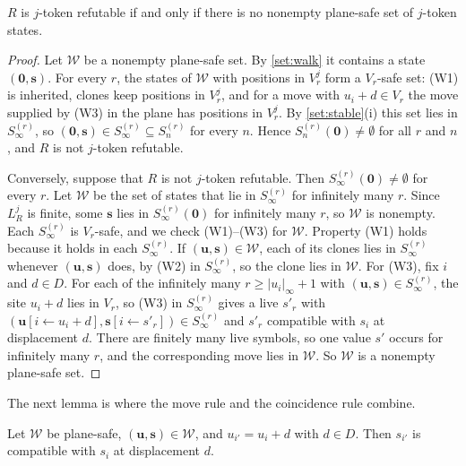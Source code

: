 \begin{lemma}\label{set:plane}
$R$ is $j$-token refutable if and only if there is no nonempty plane-safe set of $j$-token states.
\end{lemma}

\begin{proof}
Let $\mathcal W$ be a nonempty plane-safe set. By \cref{set:walk} it contains a state $(\mathbf 0,\mathbf s)$. For every $r$, the states of $\mathcal W$ with positions in $V_r^j$ form a $V_r$-safe set: (W1) is inherited, clones keep positions in $V_r^j$, and for a move with $u_i+d\in V_r$ the move supplied by (W3) in the plane has positions in $V_r^j$. By \cref{set:stable}(i) this set lies in $S^{(r)}_\infty$, so $(\mathbf 0,\mathbf s)\in S^{(r)}_\infty\subseteq S^{(r)}_n$ for every $n$. Hence $S^{(r)}_n(\mathbf 0)\ne\emptyset$ for all $r$ and $n$, and $R$ is not $j$-token refutable.

Conversely, suppose that $R$ is not $j$-token refutable. Then $S^{(r)}_\infty(\mathbf 0)\ne\emptyset$ for every $r$. Let $\mathcal W$ be the set of states that lie in $S^{(r)}_\infty$ for infinitely many $r$. Since $L_R^j$ is finite, some $\mathbf s$ lies in $S^{(r)}_\infty(\mathbf 0)$ for infinitely many $r$, so $\mathcal W$ is nonempty. Each $S^{(r)}_\infty$ is $V_r$-safe, and we check (W1)--(W3) for $\mathcal W$. Property (W1) holds because it holds in each $S^{(r)}_\infty$. If $(\mathbf u,\mathbf s)\in\mathcal W$, each of its clones lies in $S^{(r)}_\infty$ whenever $(\mathbf u,\mathbf s)$ does, by (W2) in $S^{(r)}_\infty$, so the clone lies in $\mathcal W$. For (W3), fix $i$ and $d\in D$. For each of the infinitely many $r\ge|u_i|_\infty+1$ with $(\mathbf u,\mathbf s)\in S^{(r)}_\infty$, the site $u_i+d$ lies in $V_r$, so (W3) in $S^{(r)}_\infty$ gives a live $s'_r$ with $(\mathbf u[i\leftarrow u_i+d],\mathbf s[i\leftarrow s'_r])\in S^{(r)}_\infty$ and $s'_r$ compatible with $s_i$ at displacement $d$. There are finitely many live symbols, so one value $s'$ occurs for infinitely many $r$, and the corresponding move lies in $\mathcal W$. So $\mathcal W$ is a nonempty plane-safe set.
\end{proof}

The next lemma is where the move rule and the coincidence rule combine.

\begin{lemma}\label{set:adjacent}
Let $\mathcal W$ be plane-safe, $(\mathbf u,\mathbf s)\in\mathcal W$, and $u_{i'}=u_i+d$ with $d\in D$. Then $s_{i'}$ is compatible with $s_i$ at displacement $d$.
\end{lemma}

